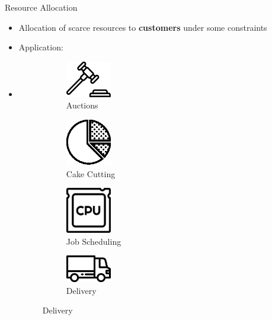 
\begin{frame}[t,plain]
\titlepage
\end{frame}

\begin{frame}[t]{Resource Allocation}
    \begin{itemize}
        \item<2-> Allocation of scarce resources to \textbf{customers} under some constraints
        \item<3-> Application:
        \item<4->[ ]
        \begin{figure}
            \begin{subfigure}[b]{0.45\textwidth}  
                \centering
                \includegraphics[width=2cm]{auction.eps}
                \caption*{Auctions}
                \label{fig:my_label}
            \end{subfigure}
            \begin{subfigure}[b]{0.45\textwidth}    
                \centering
                \includegraphics[width=2cm]{pie-chart.eps}
                \caption*{Cake Cutting}
                \label{fig:my_label}
            \end{subfigure}
            \begin{subfigure}[b]{0.45\textwidth}     
                \centering
                \includegraphics[width=2cm]{cpu.eps}
                \caption*{Job Scheduling}
                \label{fig:my_label}
            \end{subfigure}
            \begin{subfigure}[b]{0.45\textwidth}      
                \centering
                \includegraphics[width=2cm]{delivery-truck.eps}
                \caption*{Delivery}
                \label{fig:my_label}
            \end{subfigure}
        \end{figure}
    \end{itemize}    
\end{frame}

